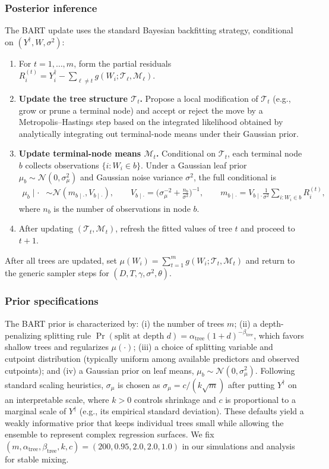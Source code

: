 \documentclass[11pt]{article}
\theoremstyle{definition}
\theoremstyle{plain}
\begin{document}
\subsubsection{Posterior inference}
The BART update uses the standard Bayesian backfitting strategy, conditional on $(Y^\dagger,W,\sigma^2)$:
\begin{enumerate}[leftmargin=*,nosep]
\item For $t=1,\dots,m$, form the partial residuals $R_i^{(t)}=Y_i^\dagger-\sum_{\ell\neq t} g(W_i;\mathcal T_\ell,\mathcal M_\ell)$.
\item \textbf{Update the tree structure $\mathcal T_t$.}
Propose a local modification of $\mathcal T_t$ (e.g., grow or prune a terminal node) and accept or reject the move by a Metropolis--Hastings step based on the integrated likelihood obtained by analytically integrating out terminal-node means under their Gaussian prior.
\item \textbf{Update terminal-node means $\mathcal M_t$.}
Conditional on $\mathcal T_t$, each terminal node $b$ collects observations $\{i:W_i\in b\}$. Under a Gaussian leaf prior $\mu_b\sim\mathcal N(0,\sigma_\mu^2)$ and Gaussian noise variance $\sigma^2$, the full conditional is
\begin{align*}
\mu_b\mid\cdot &\sim \mathcal N(m_{b\mid\cdot},V_{b\mid\cdot}),\qquad
V_{b\mid\cdot}=\Big(\sigma_\mu^{-2}+\frac{n_b}{\sigma^2}\Big)^{-1},\qquad
m_{b\mid\cdot}=V_{b\mid\cdot}\frac{1}{\sigma^2}\sum_{i:W_i\in b} R_i^{(t)},
\end{align*}
where $n_b$ is the number of observations in node $b$.
\item After updating $(\mathcal T_t,\mathcal M_t)$, refresh the fitted values of tree $t$ and proceed to $t+1$.
\end{enumerate}
After all trees are updated, set $\mu(W_i)=\sum_{t=1}^m g(W_i;\mathcal T_t,\mathcal M_t)$ and return to the generic sampler steps for $(D,T,\gamma,\sigma^2,\theta)$.

\subsubsection{Prior specifications}
The BART prior is characterized by: (i) the number of trees $m$; (ii) a depth-penalizing splitting rule $\Pr(\text{split at depth }d)=\alpha_{\mathrm{tree}}(1+d)^{-\beta_{\mathrm{tree}}}$, which favors shallow trees and regularizes $\mu(\cdot)$; (iii) a choice of splitting variable and cutpoint distribution (typically uniform among available predictors and observed cutpoints); and (iv) a Gaussian prior on leaf means, $\mu_b\sim\mathcal N(0,\sigma_\mu^2)$. Following standard scaling heuristics, $\sigma_\mu$ is chosen as $\sigma_\mu=c/(k\sqrt m)$ after putting $Y^\dagger$ on an interpretable scale, where $k>0$ controls shrinkage and $c$ is proportional to a marginal scale of $Y^\dagger$ (e.g., its empirical standard deviation). These defaults yield a weakly informative prior that keeps individual trees small while allowing the ensemble to represent complex regression surfaces. We fix $(m, \alpha_{\mathrm{tree}}, \beta_{\mathrm{tree}}, k, c)=(200, 0.95, 2.0, 2.0, 1.0)$ in our simulations and analysis for stable mixing.
\end{document}
